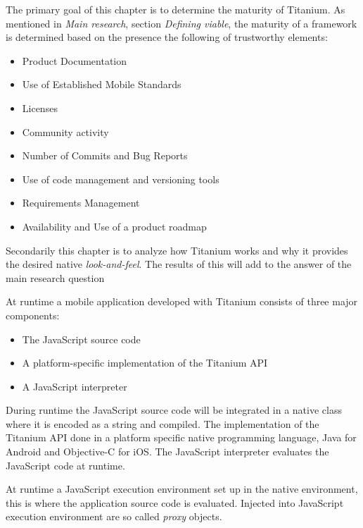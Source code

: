 



\noindent The primary goal of this chapter is to determine the maturity of Titanium. As mentioned in \emph{Main research}, section \emph{Defining viable}, the maturity of a framework is determined based on the presence the following of trustworthy elements:

\begin{itemize}
  \setlength{\itemsep}{1pt}
  \setlength{\parskip}{0pt}
  \setlength{\parsep}{0pt}
\item Product Documentation
\item Use of Established Mobile Standards
\item Licenses
\item Community activity
\item Number of Commits and Bug Reports
\item Use of code management and versioning tools
\item Requirements Management
\item Availability and Use of a product roadmap
\end{itemize}

Secondarily this chapter is to analyze how Titanium works and why it provides the desired native \emph{look-and-feel}. The results of this will add to the answer of the main research question






At runtime a mobile application developed with Titanium consists of three major components:
\begin{itemize}
	\item
	The JavaScript source code
	\item
	A platform-specific implementation of the Titanium API
	\item
	A JavaScript interpreter
\end{itemize}

During runtime the JavaScript source code will be integrated in a native class where it is encoded as a string and compiled. The implementation of the Titanium API done in a platform specific native programming language, Java for Android and Objective-C for iOS. The JavaScript interpreter evaluates the JavaScript code at runtime.


At runtime a JavaScript execution environment set up in the native environment, this is where the application source code is evaluated. Injected into JavaScript execution environment are so called \emph{proxy} objects.

